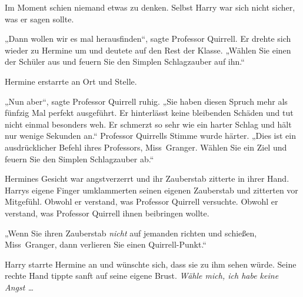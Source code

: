 Im Moment schien niemand etwas zu denken. Selbst Harry war sich nicht sicher, was er sagen sollte.

„Dann wollen wir es mal herausfinden“, sagte Professor Quirrell. Er drehte sich wieder zu Hermine um und deutete auf den Rest der Klasse.
„Wählen Sie einen der Schüler aus und feuern Sie den Simplen Schlagzauber auf ihn.“

Hermine erstarrte an Ort und Stelle.

„Nun aber“, sagte Professor Quirrell ruhig.
„Sie haben diesen Spruch mehr als fünfzig Mal perfekt ausgeführt. Er hinterlässt keine bleibenden Schäden und tut nicht einmal besonders weh. Er schmerzt so sehr wie ein harter Schlag und hält nur wenige Sekunden an.“ Professor Quirrells Stimme wurde härter.
„Dies ist ein ausdrücklicher Befehl ihres Professors, Miss~Granger. Wählen Sie ein Ziel und feuern Sie den Simplen Schlagzauber ab.“

Hermines Gesicht war angstverzerrt und ihr Zauberstab zitterte in ihrer Hand. Harrys eigene Finger umklammerten seinen eigenen Zauberstab und zitterten vor Mitgefühl. Obwohl er verstand, was Professor Quirrell versuchte. Obwohl er verstand, was Professor Quirrell ihnen beibringen wollte.

„Wenn Sie ihren Zauberstab \emph{nicht} auf jemanden richten und schießen, Miss~Granger, dann verlieren Sie einen Quirrell-Punkt.“

Harry starrte Hermine an und wünschte sich, dass sie zu ihm sehen würde. Seine rechte Hand tippte sanft auf seine eigene Brust. \emph{Wähle mich, ich habe keine Angst …}

